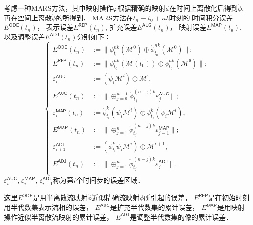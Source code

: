 \begin{defn}
	考虑一种MARS方法，其中映射操作$\varphi$根据精确的映射$\phi$在时间上离散化后得到$\mathring{ \phi}$,
	再在空间上离散$\mathring{ \phi}$的所得到．
	MARS方法在$t_n=t_0+nk$时刻的
	时间积分误差$E^{\textsf{ODE}}(t_n)$，
	表示误差$E^{\textsf{REP}}(t_n)$,
	扩充误差$E^{\textsf{AUG}}(t_n)$，
	映射误差$E^{\textsf{MAP}}(t_n)$,
	以及调整误差$E^{\textsf{ADJ}}(t_n)$分别如下：
	\begin{equation}\label{defn:error}
	\left\{
	\begin{array}{rl}
	E^{\textsf{ODE}}(t_n) &:= \| \phi_{t_0}^{nk}(\mathcal{M}^0) \oplus \mathring{ \phi}_{t_0}^{nk}(\mathcal{M}^0) \|;\\[0.2cm]
	E^{\textsf{REP}}(t_n) &:= \| \phi_{t_0}^{nk}(\mathcal{M}(t_0)) \oplus  \phi_{t_0}^{nk}(\mathcal{M}^0) \|;\\[0.2cm]
	\varepsilon_i^{\textsf{AUG}} &:=  ( \psi_i \mathcal{M}^i )\oplus \mathcal{M}^i, \\[0.2cm]
	E^{\textsf{AUG}}(t_n) &:= \| \oplus_{j=0}^{n-1} \mathring{ \phi}_{t_j}^{(n-j)k}\varepsilon_j^{\textsf{AUG}} \|;\\[0.2cm]
	\varepsilon_i^{\textsf{MAP}}(t_n)& := \mathring{ \phi}_{t_i}^k(\psi_i\mathcal{M}^i)\oplus \phi_{t_i}^k(\psi_i\mathcal{M}^i),\\[0.2cm]
	E^{\textsf{MAP}}(t_n) &:=  \| \oplus_{j=1}^n \mathring{ \phi}_{t_j}^{(n-j)k}\varepsilon_{j-1}^\textsf{MAP} \|;\\[0.2cm]
	\varepsilon_{i+1}^{\textsf{ADJ}} &:= (\phi_{t_i}^k\psi_i\mathcal{M}^i)\oplus\mathcal{M}^{i+1},\\[0.2cm]
	E^{\textsf{ADJ}}(t_n) &:= \| \oplus_{j=1}^n\mathring{ \phi}_{t_j}^{(n-j)k}\varepsilon_j^{\textsf{ADJ}}\|.\\[0.2cm]
	\end{array}\right.
	\end{equation}
	$\varepsilon_i^{\textsf{AUG}}$, $\varepsilon_i^{\textsf{MAP}}$, $\varepsilon_{i+1}^{\textsf{ADJ}}$称为第$i$个时间步的误差区域．
\end{defn}




这里$E^{\textsf{ODE}}$是用半离散流映射$\mathring{ \phi}$近似精确流映射$\phi$所引起的误差，
$E^{\textsf{REP}}$是在初始时刻用半代数集表示流相的误差，
$E^{\textsf{AUG}}$是扩充半代数集的累计误差，
$E^{\textsf{MAP}}$是用映射操作近似半离散流映射的累计误差，
$E^{\textsf{ADJ}}$是调整半代数集的像的累计误差．

